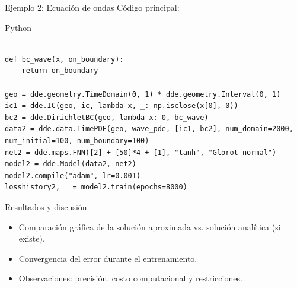 \begin{frame}[fragile]{Ejemplo 2: Ecuación de ondas}
  Código principal:
  \begin{block}{Python}
    \begin{verbatim}

def bc_wave(x, on_boundary):
    return on_boundary

geo = dde.geometry.TimeDomain(0, 1) * dde.geometry.Interval(0, 1)
ic1 = dde.IC(geo, ic, lambda x, _: np.isclose(x[0], 0))
bc2 = dde.DirichletBC(geo, lambda x: 0, bc_wave)
data2 = dde.data.TimePDE(geo, wave_pde, [ic1, bc2], num_domain=2000, num_initial=100, num_boundary=100)
net2 = dde.maps.FNN([2] + [50]*4 + [1], "tanh", "Glorot normal")
model2 = dde.Model(data2, net2)
model2.compile("adam", lr=0.001)
losshistory2, _ = model2.train(epochs=8000)
    \end{verbatim}
  \end{block}
\end{frame}

\begin{frame}{Resultados y discusión}
  \begin{itemize}
    \item Comparación gráfica de la solución aproximada vs. solución analítica (si existe).
    \item Convergencia del error durante el entrenamiento.
    \item Observaciones: precisión, costo computacional y restricciones.
  \end{itemize}
\end{frame}

